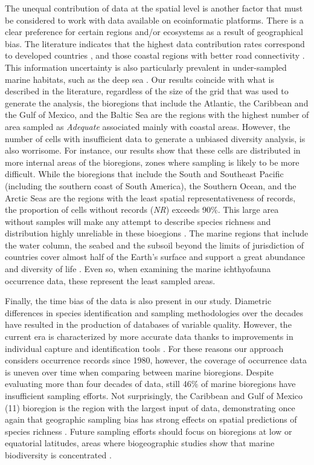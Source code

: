 \documentclass[12pt,authoryear]{elsarticle}
\begin{document}
The unequal contribution of data at the spatial level is another factor that must be considered to work with data available on ecoinformatic platforms. There is a clear preference for certain regions and/or ecosystems as a result of geographical bias. The literature indicates that the highest data contribution rates correspond to developed countries \citep{yesson2007,chandler2017}, and those coastal regions with better road connectivity \citep{chandler2017,melo2020}. This information uncertainty is also particularly prevalent in under-sampled marine habitats, such as the deep sea \citep{webb2010}. Our results coincide with what is described in the literature, regardless of the size of the grid that was used to generate the analysis, the bioregions that include the Atlantic, the Caribbean and the Gulf of Mexico, and the Baltic Sea are the regions with the highest number of area sampled as \textit{Adequate} associated mainly with coastal areas.
However, the number of cells with insufficient data to generate a unbiased diversity analysis, is also worrisome. For instance, our results show that these cells are distributed in more internal areas of the bioregions, zones where sampling is likely to be more difficult.
While the bioregions that include the South and Southeast Pacific (including the southern coast of South America), the Southern Ocean, and the Arctic Seas are the regions with the least spatial representativeness of records, the proportion of cells without records (\textit{NR}) exceeds 90\%. This large area without samples will make any attempt to describe species richness and distribution highly unreliable in these bioegions \citep{yang2013geographical, troia2017}. The marine regions that include the water column, the seabed and the subsoil beyond the limits of jurisdiction of countries cover almost half of the Earth's surface and support a great abundance and diversity of life \citep{visalli2020}. Even so, when examining the marine ichthyofauna occurrence data, these represent the least sampled areas.

Finally, the time bias of the data is also present in our study. Diametric differences in species identification and sampling methodologies over the decades have resulted in the production of databases of variable quality. However, the current era is characterized by more accurate data thanks to improvements in individual capture and identification tools \citep{costello2015conser,jin2020bdcleaner}. For these reasons our approach considers occurrence records since 1980, however, the coverage of occurrence data is uneven over time when comparing between marine bioregions. Despite evaluating more than four decades of data, still 46\% of marine bioregions have insufficient sampling efforts. Not surprisingly, the Caribbean and Gulf of Mexico (11) bioregion is the region with the largest input of data, demonstrating once again that geographic sampling bias has strong effects on spatial predictions of species richness \citep{yang2013geographical}. Future sampling efforts should focus on bioregions at low or equatorial latitudes, areas where biogeographic studies show that marine biodiversity is concentrated \citep{costello2017marine}.
\end{document}
